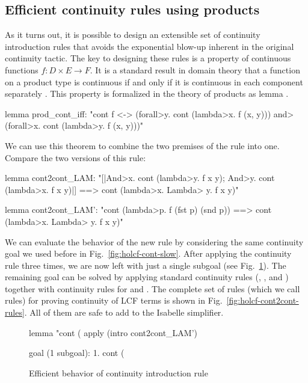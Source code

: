\subsection{Efficient continuity rules using products}

As it turns out, it is possible to design an extensible set of continuity introduction rules that avoids the exponential blow-up inherent in the original  continuity tactic. The key to designing these rules is a property of continuous functions $f : D \times E \to F$. It is a standard result in domain theory that a function on a product type is continuous if and only if it is continuous in each component separately \cite[Lemma 3.2.6]{abramsky94domain}. This property is formalized in the  theory of products as lemma .
%
\begin{isacode}
lemma prod_cont_iff:
  "cont f <-> (\<forall>y. cont (\<lambda>x. f (x, y))) \<and> (\<forall>x. cont (\<lambda>y. f (x, y)))"
\end{isacode}
%
We can use this theorem to combine the two premises of the  rule into one. Compare the two versions of this rule:
%
\begin{isacode}
lemma cont2cont_LAM:
  "[|\<And>x. cont (\<lambda>y. f x y); \<And>y. cont (\<lambda>x. f x y)|] ==> cont (\<lambda>x. \<Lambda> y. f x y)"
\end{isacode}
\unmedskip
{}
\begin{isacode}
lemma cont2cont_LAM':
  "cont (\<lambda>p. f (fst p) (snd p)) ==> cont (\<lambda>x. \<Lambda> y. f x y)"
\end{isacode}
%
We can evaluate the behavior of the new  rule by considering the same continuity goal we used before in Fig.~\ref{fig:holcf-cont-slow}. After applying the continuity rule  three times, we are now left with just a single subgoal (see Fig.~\ref{fig:holcf-cont-fast}). The remaining goal can be solved by applying standard continuity rules (, , and ) together with continuity rules for  and . The complete set of rules (which we call  rules) for proving continuity of LCF terms is shown in Fig.~\ref{fig:holcf-cont2cont-rules}. All of them are safe to add to the Isabelle simplifier.

\begin{figure}
\begin{singlespace}
\begin{isabelle}
lemma "cont (%
  apply (intro cont2cont_LAM')
 
goal (1 subgoal):
 1. cont (%
\end{isabelle}
\end{singlespace}
\caption{Efficient behavior of continuity introduction rule }
\label{fig:holcf-cont-fast}
\end{figure}

